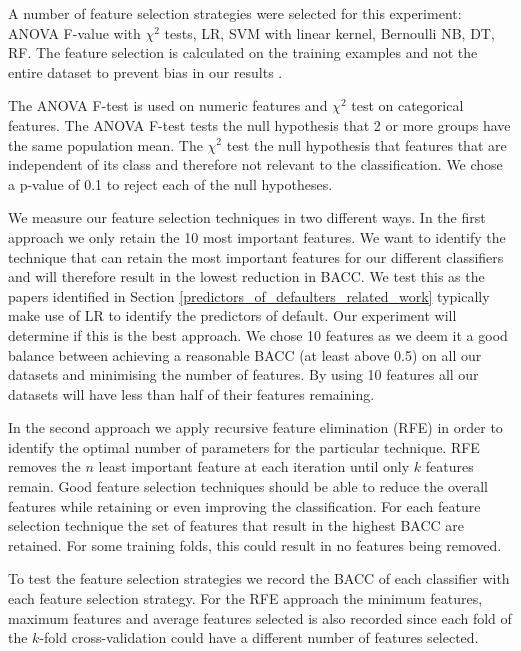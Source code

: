\documentclass{sig-alternate-05-2015}
\begin{document}
	A number of feature selection strategies were selected for this experiment: ANOVA F-value with $\chi^2$ tests, LR, SVM with linear kernel, Bernoulli NB, DT, RF. The feature selection is calculated on the training examples and not the entire dataset to prevent bias in our results \cite{PMID:25988841}.
	
	The ANOVA F-test is used on numeric features and $\chi^2$ test on categorical features. The ANOVA F-test tests the null hypothesis that 2 or more groups have the same population mean. The $\chi^2$ test the null hypothesis that features that are independent of its class and therefore not relevant to the classification. We chose a p-value of 0.1 to reject each of the null hypotheses. 
	
	We measure our feature selection techniques in two different ways. In the first approach we only retain the 10 most important features.  We want to identify the technique that can retain the most important features for our different classifiers and will therefore result in the lowest reduction in BACC. We test this as the papers identified in Section \ref{predictors_of_defaulters_related_work} typically make use of LR to identify the predictors of default. Our experiment will determine if this is the best approach. We chose 10 features as we deem it a good balance between achieving a reasonable BACC (at least above 0.5) on all our datasets and minimising the number of features. By using 10 features all our datasets will have less than half of their features remaining.
	
	In the second approach we apply recursive feature elimination (RFE) in order to identify the optimal number of parameters for the particular technique. RFE removes the $n$ least important feature at each iteration until only $k$ features remain. Good feature selection techniques should be able to reduce the overall features while retaining or even improving the classification. For each feature selection technique the set of features that result in the highest BACC are retained. For some training folds, this could result in no features being removed. 
	
	To test the feature selection strategies we record the BACC of each classifier with each feature selection strategy. For the RFE approach the minimum features, maximum features and average features selected is also recorded since each fold of the $k$-fold cross-validation could have a different number of features selected.
	
\end{document}
